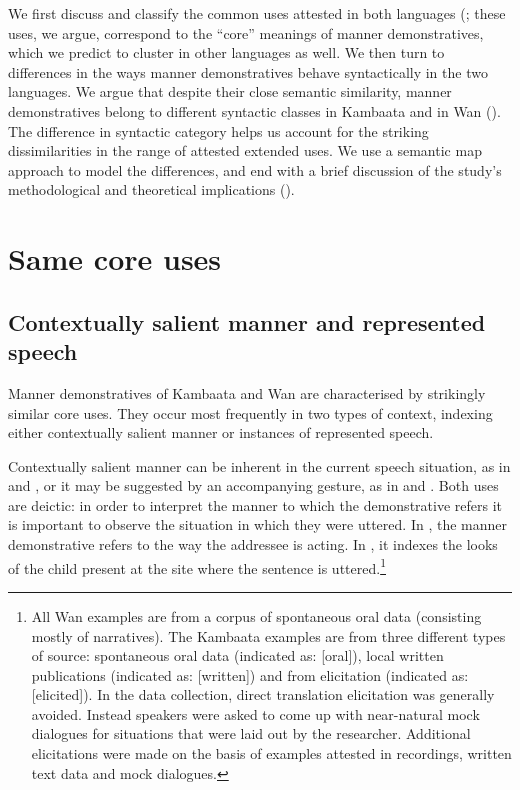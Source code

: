 \documentclass[output=paper,colorlinks,citecolor=brown]{langscibook}
\begin{document}
We first discuss and classify the common uses attested in both languages (; these uses, we argue, correspond to the “core” meanings of manner demonstratives, which we predict to cluster in other languages as well. We then turn to differences in the ways manner demonstratives behave syntactically in the two languages. We argue that despite their close semantic similarity, manner demonstratives belong to different syntactic classes in Kambaata and in Wan (). The difference in syntactic category helps us account for the striking dissimilarities in the range of attested extended uses. We use a semantic map approach to model the differences, and end with a brief discussion of the study’s methodological and theoretical implications ().


\section{Same core uses}\label{sec:nikitina:2}

\subsection{Contextually salient manner and represented speech}\label{sec:nikitina:2.1}


Manner demonstratives of Kambaata and Wan are characterised by strikingly similar core uses. They occur most frequently in two types of context, indexing either contextually salient manner or instances of represented speech.

Contextually salient manner can be inherent in the current speech situation, as in  and , or it may be suggested by an accompanying gesture, as in  and . Both uses are deictic: in order to interpret the manner to which the demonstrative refers it is important to observe the situation in which they were uttered. In , the manner demonstrative refers to the way the addressee is acting. In , it indexes the looks of the child present at the site where the sentence is uttered.\footnote{All Wan examples are from a corpus of spontaneous oral data (consisting mostly of narratives). The Kambaata examples are from three different types of source: spontaneous oral data (indicated as: [oral]), local written publications (indicated as: [written]) and from elicitation (indicated as: [elicited]). In the data collection, direct translation elicitation was generally avoided. Instead speakers were asked to come up with near-natural mock dialogues for situations that were laid out by the researcher. Additional elicitations were made on the basis of examples attested in recordings, written text data and mock dialogues.}
\end{document}
